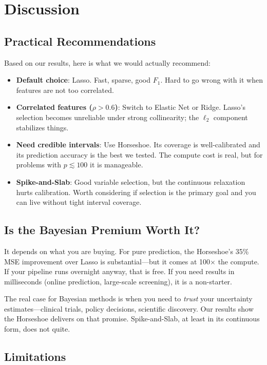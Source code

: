 \section{Discussion}
\label{sec:discussion}

\subsection{Practical Recommendations}

Based on our results, here is what we would actually recommend:

\begin{itemize}[nosep]
    \item \textbf{Default choice}: Lasso. Fast, sparse, good $F_1$. Hard to go wrong with it when features are not too correlated.
    \item \textbf{Correlated features ($\rho > 0.6$)}: Switch to Elastic Net or Ridge. Lasso's selection becomes unreliable under strong collinearity; the $\ell_2$ component stabilizes things.
    \item \textbf{Need credible intervals}: Use Horseshoe. Its coverage is well-calibrated and its prediction accuracy is the best we tested. The compute cost is real, but for problems with $p \lesssim 100$ it is manageable.
    \item \textbf{Spike-and-Slab}: Good variable selection, but the continuous relaxation hurts calibration. Worth considering if selection is the primary goal and you can live without tight interval coverage.
\end{itemize}

\subsection{Is the Bayesian Premium Worth It?}

It depends on what you are buying.
For pure prediction, the Horseshoe's 35\% MSE improvement over Lasso is substantial---but it comes at 100$\times$ the compute.
If your pipeline runs overnight anyway, that is free.
If you need results in milliseconds (online prediction, large-scale screening), it is a non-starter.

The real case for Bayesian methods is when you need to \emph{trust} your uncertainty estimates---clinical trials, policy decisions, scientific discovery.
Our results show the Horseshoe delivers on that promise.
Spike-and-Slab, at least in its continuous form, does not quite.

\subsection{Limitations}

